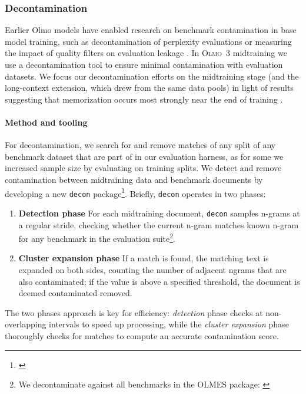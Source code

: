 \documentclass[table]{ai2style/ai2}
\newcommand{\newOlmo}{Olmo\xspace}
\newcommand{\olmothree}{\textsc{\newOlmo~3}\xspace}
\begin{document}
\subsubsection{Decontamination}
\label{sec:midtraining-contamination}

Earlier \newOlmo models have enabled research on benchmark contamination in base model training, such as decontamination of perplexity evaluations \citep{magnusson2024palomabenchmarkevaluatinglanguage} or measuring the impact of quality filters on evaluation leakage \citep{godey2025gaperonpepperedenglishfrenchgenerative}. In \olmothree midtraining we use a decontamination tool to ensure minimal contamination with evaluation datasets. 
We focus our decontamination efforts on the midtraining stage (and the long-context extension, which drew from the same data pools) in light of results suggesting that memorization occurs most strongly near the end of training \citep{Magar2022DataCF, Bordt2024HowMC}.

\paragraph{Method and tooling} 
For decontamination, we search for and remove  matches of any split of any benchmark dataset that are part of in our evaluation harness, as for some we increased sample size by evaluating on training splits. 
We detect and remove contamination between midtraining data and benchmark documents by developing a new \texttt{decon} package\footnote{\href{https://github.com/allenai/decon}{}}. 
Briefly, \texttt{decon} operates in two phases: 

\begin{enumerate}
    \item {\bf{Detection phase}} For each midtraining document, \texttt{decon} samples n-grams at a regular stride, checking whether the current n-gram matches known n-gram for any benchmark in the evaluation suite\footnote{We decontaminate against all benchmarks in the \textsc{OLMES} package: \href{https://github.com/allenai/olmes}{}}.
    \item {\bf{Cluster expansion phase}} If a match is found, the matching text is expanded on both sides, counting the number of adjacent ngrams that are also contaminated; if the value is above a specified threshold, the document is deemed contaminated removed. 
\end{enumerate}

The two phases approach is key for efficiency: \textit{detection} phase checks at non-overlapping intervals to speed up processing, while the \textit{cluster expansion} phase thoroughly checks for matches to compute an accurate contamination score.  
\end{document}
